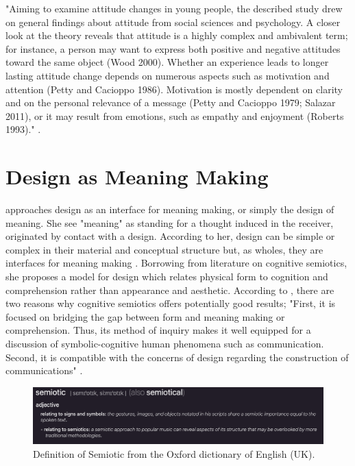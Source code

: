 "Aiming to examine attitude changes in young people, the described study drew on general findings about attitude from social sciences and psychology. A closer look at the theory reveals that attitude is a highly complex and ambivalent term; for instance, a person may want to express both positive and negative attitudes toward the same object (Wood 2000). Whether an experience leads to longer lasting attitude change depends on numerous aspects such as motivation and attention (Petty and Cacioppo 1986). Motivation is mostly dependent on clarity and on the personal relevance of a message (Petty and Cacioppo 1979; Salazar 2011), or it may result from emotions, such as empathy and enjoyment (Roberts 1993)." \autocite[p. 96]{gorr_changing_2014}.



\section{Design as Meaning Making}

\autocite{kazmierczak_meaningmaking_2003} approaches design as an interface for meaning making, or simply the design of meaning. She see "meaning" as standing for a thought induced in the receiver, originated by contact with a design. According to her, design can be simple or complex in their material and conceptual structure but, as wholes, they are interfaces for meaning making \autocite[p. 47]{kazmierczak_meaningmaking_2003}. Borrowing from literature on cognitive semiotics, she proposes a model for design which relates physical form to cognition and comprehension rather than appearance and aesthetic. According to \autocite{kazmierczak_meaningmaking_2003}, there are two reasons why cognitive semiotics offers potentially good results; "First, it is focused on bridging the gap between form and meaning making or comprehension. Thus, its method of inquiry makes it well equipped for a discussion of symbolic-cognitive human phenomena such as communication. Second, it is compatible with the concerns of design regarding the construction of communications" \autocite[p. 47]{kazmierczak_meaningmaking_2003}. 

\begin{figure}[H]
\includegraphics[width=12.5cm]{pictures/background/semiotic.png}
\caption{Definition of Semiotic from the Oxford dictionary of English (UK).}
\centering
\end{figure}

